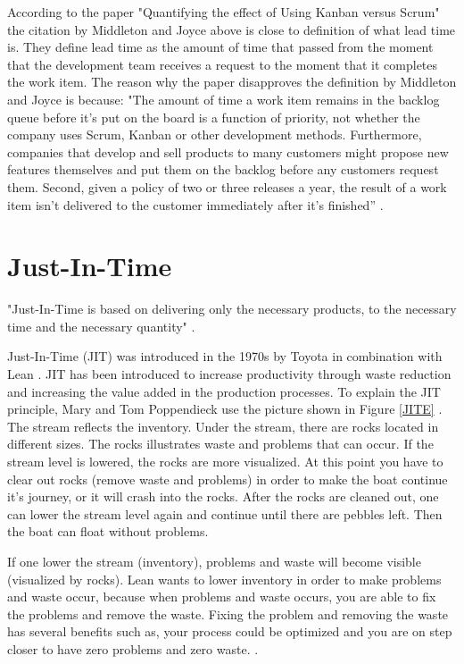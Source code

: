 \documentclass[UKenglish]{ifimaster}  %
\begin{document}
According to the paper "Quantifying the effect of Using Kanban versus Scrum" \parencite{Dag} the citation by Middleton and Joyce above is close to definition of what lead time is. They define lead time as the amount of time that passed from the moment that the development team receives a request to the moment that it completes the work item. The reason why the paper disapproves the definition by Middleton and Joyce is because: "The amount of time a work item remains in the backlog queue before it's put on the board is a function of priority, not whether the company uses Scrum, Kanban or other development methods. Furthermore, companies that develop and sell products to many customers might propose new features themselves and put them on the backlog before any customers request them. Second, given a policy of two or three releases a year, the result of a work item isn't delivered to the customer immediately after it's finished'' \parencite{Dag}.



\section{Just-In-Time}
"Just-In-Time is based on delivering only the necessary products, to the necessary time and the necessary quantity" \parencite{JIT}.

Just-In-Time (JIT) was introduced in the 1970s by Toyota in combination with Lean \parencite{javadian2013just}.  JIT has been introduced to increase productivity through waste reduction and increasing the value added in the production processes. To explain the JIT principle, Mary and Tom Poppendieck use the picture shown in Figure \ref{JITE}  \parencite{JIT} \parencite{Lean:2006}. The stream reflects the inventory.  Under the stream, there are rocks located in different sizes. The rocks illustrates waste and problems that can occur.  If the stream level is lowered, the rocks are more visualized. At this point you have to clear out rocks (remove waste and problems) in order to make the boat continue it's journey, or it will crash into the rocks. After the rocks are cleaned out, one can lower the stream level again and continue until there are pebbles left. Then the boat can float without problems.

If one lower the stream (inventory), problems and waste will become visible (visualized by rocks). Lean wants to lower inventory in order to make problems and waste occur, because when problems and waste occurs, you are able to fix the problems and remove the waste. Fixing the problem and removing the waste has several benefits such as, your process could be optimized and you are on step closer to have zero problems and zero waste.  \parencite{JIT} \parencite{Lean:2006}.
\end{document}
